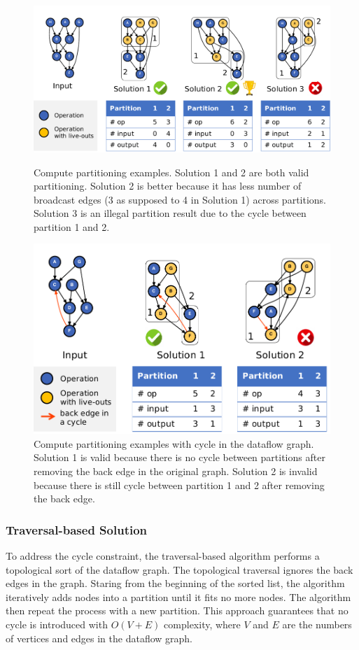 \begin{figure}
  \centering
  \includegraphics[width=1\columnwidth]{figs/parteg.pdf}
  \caption[Compute partitioning examples]{
    Compute partitioning examples. Solution 1 and 2 are both valid partitioning. Solution 2 is
    better because it has less number of broadcast edges (3 as supposed to 4 in Solution 1) across partitions. 
    Solution 3 is an illegal partition result due to the cycle between partition 1 and 2.
  }
  \label{fig:parteg}

  \includegraphics[width=0.8\columnwidth]{figs/partcycleeg.pdf}
  \caption[Compute partitioning examples with cycle]{
    Compute partitioning examples with cycle in the dataflow graph.
    Solution 1 is valid because there is no 
    cycle between partitions after removing the back edge in
    the original graph.
    Solution 2 is invalid because there is still cycle between partition 1 and 2 after
    removing the back edge.
  }
  \label{fig:partcycleeg}
\end{figure}

\subsubsection{Traversal-based Solution}
To address the cycle constraint, the traversal-based algorithm performs a topological sort of the dataflow graph.
The topological traversal ignores the back edges in the graph. 
Staring from the beginning of the sorted list, the algorithm iteratively adds nodes into a partition
until it fits no more nodes. The algorithm then repeat the process with a new partition.
This approach guarantees that no cycle is introduced with $O(V+E)$ complexity, 
where $V$ and $E$ are the numbers of vertices and edges in the dataflow graph.

